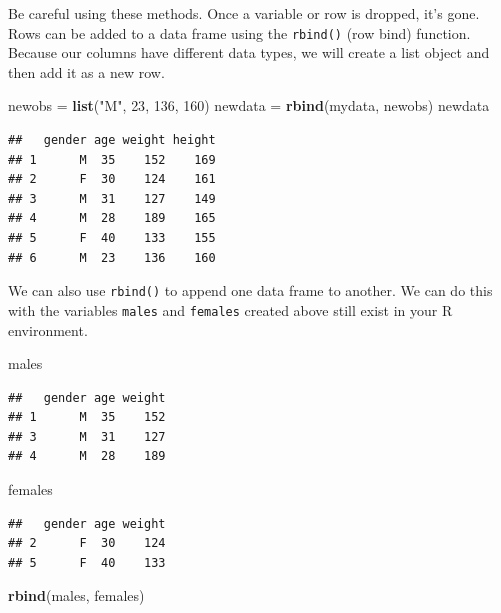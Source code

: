 \documentclass[
]{book}
\newenvironment{Shaded}{\begin{snugshade}}{\end{snugshade}}
\newcommand{\DecValTok}[1]{\textcolor[rgb]{0.00,0.00,0.81}{#1}}
\newcommand{\KeywordTok}[1]{\textcolor[rgb]{0.13,0.29,0.53}{\textbf{#1}}}
\newcommand{\NormalTok}[1]{#1}
\newcommand{\StringTok}[1]{\textcolor[rgb]{0.31,0.60,0.02}{#1}}
\begin{document}
Be careful using these methods. Once a variable or row is dropped, it's gone. Rows can be added to a data frame using the \texttt{rbind()} (row bind) function. Because our columns have different data types, we will create a list object and then add it as a new row.

\begin{Shaded}
\begin{Highlighting}[]
\NormalTok{newobs =}\StringTok{ }\KeywordTok{list}\NormalTok{(}\StringTok{"M"}\NormalTok{, }\DecValTok{23}\NormalTok{, }\DecValTok{136}\NormalTok{, }\DecValTok{160}\NormalTok{)}
\NormalTok{newdata =}\StringTok{ }\KeywordTok{rbind}\NormalTok{(mydata, newobs)}
\NormalTok{newdata}
\end{Highlighting}
\end{Shaded}

\begin{verbatim}
##   gender age weight height
## 1      M  35    152    169
## 2      F  30    124    161
## 3      M  31    127    149
## 4      M  28    189    165
## 5      F  40    133    155
## 6      M  23    136    160
\end{verbatim}

We can also use \texttt{rbind()} to append one data frame to another. We can do this with the variables \texttt{males} and \texttt{females} created above still exist in your R environment.

\begin{Shaded}
\begin{Highlighting}[]
\NormalTok{males}
\end{Highlighting}
\end{Shaded}

\begin{verbatim}
##   gender age weight
## 1      M  35    152
## 3      M  31    127
## 4      M  28    189
\end{verbatim}

\begin{Shaded}
\begin{Highlighting}[]
\NormalTok{females}
\end{Highlighting}
\end{Shaded}

\begin{verbatim}
##   gender age weight
## 2      F  30    124
## 5      F  40    133
\end{verbatim}

\begin{Shaded}
\begin{Highlighting}[]
\KeywordTok{rbind}\NormalTok{(males, females)}
\end{Highlighting}
\end{Shaded}
\end{document}

